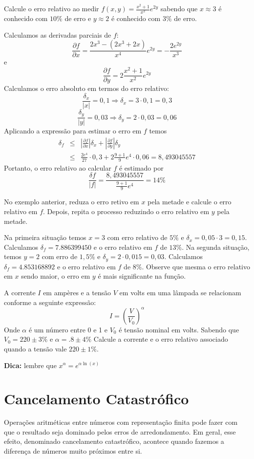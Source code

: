\begin{ex} Calcule o erro relativo ao medir $f(x,y)=\frac{x^2+1}{x^2}e^{2y}$ sabendo que $x\approx 3$ é conhecido com $10\%$ de erro e $y\approx 2$ é conhecido com $3\%$ de erro.

Calculamos as derivadas parciais de $f$:
$$
\frac{\partial f}{\partial x}=\frac{2x^3-(2x^3+2x)}{x^4}e^{2y}=-\frac{2e^{2y}}{x^3}
$$
e
$$
\frac{\partial f}{\partial y}=2\frac{x^2+1}{x^2}e^{2y}
$$
Calculamos o erro absoluto em termos do erro relativo:
$$
\frac{\delta_x}{|x|}=0,1\Rightarrow \delta_x= 3\cdot 0,1=0,3
$$
$$
\frac{\delta_y}{|y|}=0,03\Rightarrow \delta_y= 2\cdot 0,03=0,06
$$
Aplicando a expressão para estimar o erro em $f$ temos
\begin{eqnarray*}
\delta_f &\leq& \left|\frac{\partial f}{\partial x}\right|\delta_x+\left|\frac{\partial f}{\partial y}\right|\delta_y\\
&\leq& \frac{2e^{4}}{27}\cdot 0,3+2\frac{9+1}{9}e^{4}\cdot 0,06=8,493045557
\end{eqnarray*}
Portanto, o erro relativo ao calcular $f$ é estimado por
$$
\frac{\delta f}{|f|}=\frac{8,493045557}{\frac{9+1}{9}e^{4}}=14\%
$$
\end{ex}
\begin{ex} No exemplo anterior, reduza o erro retivo em $x$ pela metade e calcule o erro relativo em $f$. Depois, repita o processo reduzindo o erro relativo em $y$ pela metade.

Na primeira situação temos $x=3$ com erro relativo de $5\%$ e $\delta_x=0,05\cdot 3=0,15$. Calculamos $\delta_f=7.886399450$ e o erro relativo em $f$ de $13\%$. Na segunda situação, temos $y=2$ com erro de $1,5\%$ e $\delta_y=2\cdot 0,015=0,03$. Calculamos $\delta_f=4.853168892$ e o erro relativo em $f$ de $8\%$. Observe que mesma o erro relativo em $x$ sendo maior, o erro em $y$ é mais significante na função.
\end{ex}

\begin{prob} A corrente $I$ em ampères e a tensão $V$ em volts em uma lâmpada se relacionam conforme a seguinte expressão:
$$I=\left(\frac{V}{V_0}\right)^\alpha$$
Onde $\alpha$ é um número entre 0 e 1 e $V_0$ é tensão nominal em volts. Sabendo que $V_0=220\pm 3\%$ e $\alpha=.8\pm 4\%$
Calcule a corrente e o erro relativo associado quando a tensão vale $220\pm 1\%$.

{\bf Dica:} lembre que $x^\alpha=e^{\alpha \ln(x)}$
\end{prob}


\section{Cancelamento Catastrófico}
Operações aritméticas entre números com representação finita pode fazer com que o resultado seja dominado pelos erros de arredondamento. Em geral, esse efeito, denominado cancelamento catastrófico, acontece quando fazemos a diferença de números muito próximos entre si.

